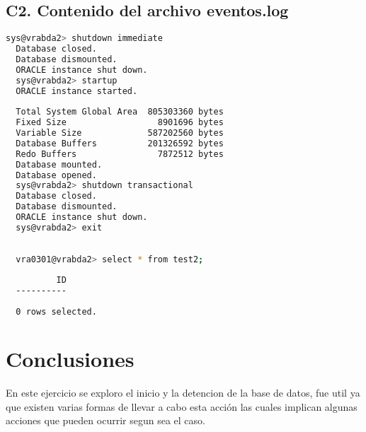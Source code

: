 \documentclass[journal]{IEEEtran}
\begin{document}
\subsection{C2. Contenido del archivo eventos.log}
\begin{lstlisting}[language=bash, caption=eventos.log,label={lst:eventos_log}]
  sys@vrabda2> shutdown immediate
  Database closed.
  Database dismounted.
  ORACLE instance shut down.
  sys@vrabda2> startup
  ORACLE instance started.
  
  Total System Global Area  805303360 bytes                                       
  Fixed Size                  8901696 bytes                                       
  Variable Size             587202560 bytes                                       
  Database Buffers          201326592 bytes                                       
  Redo Buffers                7872512 bytes                                       
  Database mounted.
  Database opened.
  sys@vrabda2> shutdown transactional
  Database closed.
  Database dismounted.
  ORACLE instance shut down.
  sys@vrabda2> exit
  
  
  vra0301@vrabda2> select * from test2;
  
          ID                                                                      
  ----------                                                                      
  
  0 rows selected.
  \end{lstlisting}

\section{Conclusiones}
En este ejercicio se exploro el inicio y la detencion de la base de datos, fue util ya que
existen varias formas de llevar a cabo esta acción las cuales implican algunas acciones 
que pueden ocurrir segun sea el caso.
\ifCLASSOPTIONcaptionsoff
  \newpage

\fi
\end{document}
